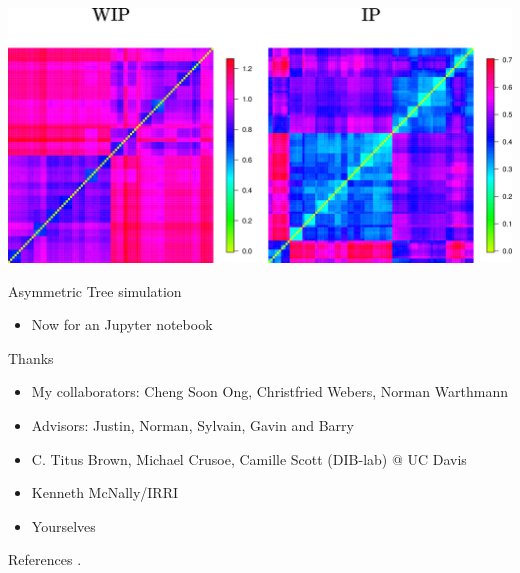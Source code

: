 \documentclass[t]{beamer}
\begin{document}
\begin{frame}
  \begin{center}
    \includegraphics[width=\textwidth]{img/distmat-both.png}
  \end{center}
\end{frame}


\begin{frame}{Asymmetric Tree simulation}
  \begin{itemize}
    \item Now for an Jupyter notebook
  \end{itemize}
\end{frame}

\begin{frame}{Thanks}
  \begin{itemize}
    \item My collaborators: Cheng Soon Ong, Christfried Webers, Norman Warthmann
    \item Advisors: Justin, Norman, Sylvain, Gavin and Barry
    \item C. Titus Brown, Michael Crusoe, Camille Scott (DIB-lab) @ UC Davis
    \item Kenneth McNally/IRRI
    \item Yourselves
  \end{itemize}
\end{frame}

\begin{frame}[shrink=20]{References}
  \printbibliography
  \vfill
  .
\end{frame}
\end{document}
